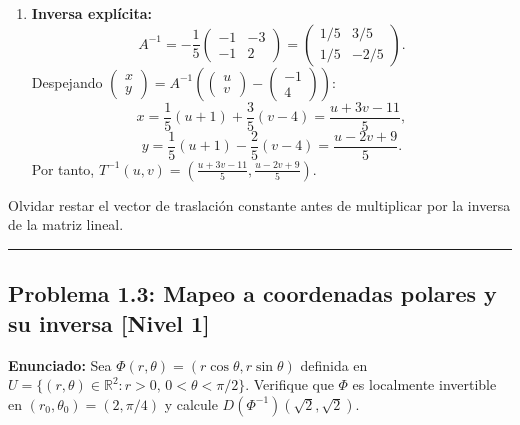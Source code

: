 \documentclass[11pt,a4paper]{article}
\begin{document}
\begin{enumerate}[label=\textbf{\arabic*.}]
\item \textbf{Inversa explícita:}
\begin{equation*}
A^{-1} = -\frac{1}{5} \begin{pmatrix} -1 & -3 \\ -1 & 2 \end{pmatrix} = \begin{pmatrix} 1/5 & 3/5 \\ 1/5 & -2/5 \end{pmatrix}.
\end{equation*}
Despejando $\begin{pmatrix} x \\ y \end{pmatrix} = A^{-1} \left( \begin{pmatrix} u \\ v \end{pmatrix} - \begin{pmatrix} -1 \\ 4 \end{pmatrix} \right)$:
\begin{equation*}
x = \frac{1}{5}(u+1) + \frac{3}{5}(v-4) = \frac{u + 3v - 11}{5},
\end{equation*}
\begin{equation*}
y = \frac{1}{5}(u+1) - \frac{2}{5}(v-4) = \frac{u - 2v + 9}{5}.
\end{equation*}
Por tanto, $T^{-1}(u,v) = \left( \frac{u + 3v - 11}{5}, \frac{u - 2v + 9}{5} \right)$.
\end{enumerate}

\begin{trapbox}
Olvidar restar el vector de traslación constante antes de multiplicar por la inversa de la matriz lineal.
\end{trapbox}

\vspace{0.5cm}
\hrule
\vspace{0.5cm}

\subsection*{Problema 1.3: Mapeo a coordenadas polares y su inversa \hfill \color{primaryblue}\small[Nivel 1]}

\begin{tcolorbox}[colback=white,colframe=gray!40,arc=1mm,boxrule=0.5pt,left=3mm,right=3mm,top=2mm,bottom=2mm]
\textbf{Enunciado:} Sea $\Phi(r,\theta) = (r\cos\theta, r\sin\theta)$ definida en $U = \{(r,\theta) \in \mathbb{R}^2 : r > 0, \, 0 < \theta < \pi/2\}$. Verifique que $\Phi$ es localmente invertible en $(r_0, \theta_0) = (2, \pi/4)$ y calcule $D(\Phi^{-1})(\sqrt{2}, \sqrt{2})$.
\end{tcolorbox}
\end{document}
